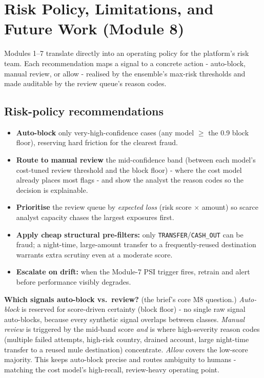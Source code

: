 \documentclass[11pt,a4paper]{report}
\newcommand{\code}[1]{\texttt{\small #1}}
\begin{document}
\chapter{Risk Policy, Limitations, and Future Work (Module 8)}
\label{ch:m8}

Modules 1–7 translate directly into an operating policy for the platform's risk team. Each
recommendation maps a signal to a concrete action - auto-block, manual review, or allow -
realised by the ensemble's max-risk thresholds and made auditable by the review queue's
reason codes.

\section{Risk-policy recommendations}

\begin{itemize}[nosep,leftmargin=1.4em]
  \item \textbf{Auto-block} only very-high-confidence cases (any model $\ge$ the 0.9 block
        floor), reserving hard friction for the clearest fraud.
  \item \textbf{Route to manual review} the mid-confidence band (between each model's
        cost-tuned review threshold and the block floor) - where the cost model already
        places most flags - and show the analyst the reason codes so the decision is
        explainable.
  \item \textbf{Prioritise} the review queue by \emph{expected loss} (risk score $\times$
        amount) so scarce analyst capacity chases the largest exposures first.
  \item \textbf{Apply cheap structural pre-filters:} only \code{TRANSFER}/\code{CASH\_OUT}
        can be fraud; a night-time, large-amount transfer to a frequently-reused destination
        warrants extra scrutiny even at a moderate score.
  \item \textbf{Escalate on drift:} when the Module-7 PSI trigger fires, retrain and alert
        before performance visibly degrades.
\end{itemize}

\begin{keybox}
\textbf{Which signals auto-block vs.\ review?} (the brief's core M8 question.) \emph{Auto-block}
is reserved for score-driven certainty (block floor) - no single raw signal auto-blocks,
because every synthetic signal overlaps between classes. \emph{Manual review} is triggered by
the mid-band score \emph{and} is where high-severity reason codes (multiple failed attempts,
high-risk country, drained account, large night-time transfer to a reused mule destination)
concentrate. \emph{Allow} covers the low-score majority. This keeps auto-block precise and
routes ambiguity to humans - matching the cost model's high-recall, review-heavy operating
point.
\end{keybox}
\end{document}
